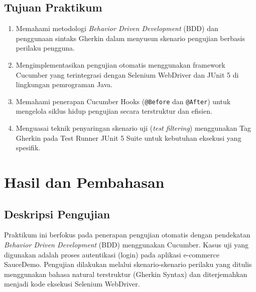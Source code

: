 \documentclass[a4paper,oneside,11pt]{book}
\begin{document}
\section{Tujuan Praktikum}
\begin{enumerate}
  \item Memahami metodologi \textit{Behavior Driven Development} (BDD) dan penggunaan sintaks Gherkin dalam menyusun skenario pengujian berbasis perilaku pengguna.
  \item Mengimplementasikan pengujian otomatis menggunakan framework Cucumber yang terintegrasi dengan Selenium WebDriver dan JUnit 5 di lingkungan pemrograman Java.
  \item Memahami penerapan Cucumber Hooks (\texttt{@Before} dan \texttt{@After}) untuk mengelola siklus hidup pengujian secara terstruktur dan efisien.
  \item Menguasai teknik penyaringan skenario uji (\textit{test filtering}) menggunakan Tag Gherkin pada Test Runner JUnit 5 Suite untuk kebutuhan eksekusi yang spesifik.
\end{enumerate}

\chapter{Hasil dan Pembahasan}

\section{Deskripsi Pengujian}
Praktikum ini berfokus pada penerapan pengujian otomatis dengan pendekatan \textit{Behavior Driven Development} (BDD) menggunakan Cucumber. Kasus uji yang digunakan adalah proses autentikasi (login) pada aplikasi e-commerce SauceDemo. Pengujian dilakukan melalui skenario-skenario perilaku yang ditulis menggunakan bahasa natural terstruktur (Gherkin Syntax) dan diterjemahkan menjadi kode eksekusi Selenium WebDriver.
\end{document}
